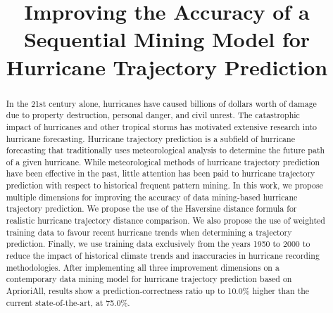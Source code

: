 \documentclass[12pt,conference]{IEEEtran}
\begin{document}
\raggedbottom

\title{Improving the Accuracy of a Sequential Mining Model for Hurricane Trajectory Prediction}

\author{
}

\maketitle


\begin{abstract}

In the 21st century alone, hurricanes have caused billions of dollars worth of damage due to property destruction, personal danger, and civil unrest. The catastrophic impact of hurricanes and other tropical storms has motivated extensive research into hurricane forecasting. Hurricane trajectory prediction is a subfield of hurricane forecasting that traditionally uses meteorological analysis to determine the future path of a given hurricane. While meteorological methods of hurricane trajectory prediction have been effective in the past, little attention has been paid to hurricane trajectory prediction with respect to historical frequent pattern mining. In this work, we propose multiple dimensions for improving the accuracy of data mining-based hurricane trajectory prediction. We propose the use of the Haversine distance formula for realistic hurricane trajectory distance comparison. We also propose the use of weighted training data to favour recent hurricane trends when determining a trajectory prediction. Finally, we use training data exclusively from the years 1950 to 2000 to reduce the impact of historical climate trends and inaccuracies in hurricane recording methodologies. After implementing all three improvement dimensions on a contemporary data mining model for hurricane trajectory prediction based on AprioriAll, results show a prediction-correctness ratio up to 10.0\% higher than the current state-of-the-art, at 75.0\%.

\end{abstract}
\end{document}
